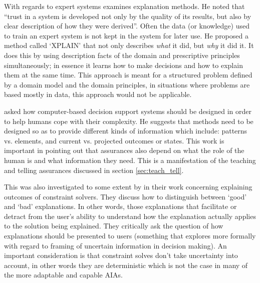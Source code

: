     With regards to expert systems \citet{Swartout1983-ko} examines explanation methods. He noted that ``trust in a system is developed not only by the quality of its results, but also by clear description of how they were derived''. Often the data (or knowledge) used to train an expert system is not kept in the system for later use. He proposed a method called `XPLAIN' that not only describes \emph{what} it did, but \emph{why} it did it. It does this by using description facts of the domain and prescriptive principles simultaneously; in essence it learns how to make decisions and how to explain them at the same time. This approach is meant for a  structured problem defined by a domain model and the domain principles, in situations where problems are based mostly in data, this approach would not be applicable.

    \citet{Rouse1986-dz} asked how computer-based decision support systems should be designed in order to help humans cope with their complexity. He suggests that methods need to be designed so as to provide different kinds of information which include: patterns vs. elements, and current vs. projected outcomes or states. This work is important in pointing out that assurances also depend on what the role of the human is and what information they need. This is a manifestation of the teaching and telling assurances discussed in section \ref{sec:teach_tell}.

    This was also investigated to some extent by \citet{Wallace2001-fm} in their work concerning explaining outcomes of constraint solvers. They discuss how to distinguish between `good' and `bad' explanations. In other words, those explanations that facilitate or detract from the user's ability to understand how the explanation actually applies to the solution being explained. They critically ask the question of how explanations should be presented to users (something that \citet{Kuhn1997-qc} explores more formally with regard to framing of uncertain information in decision making). An important consideration is that constraint solves don't take uncertainty into account, in other words they are deterministic which is not the case in many of the more adaptable and capable AIAs.

